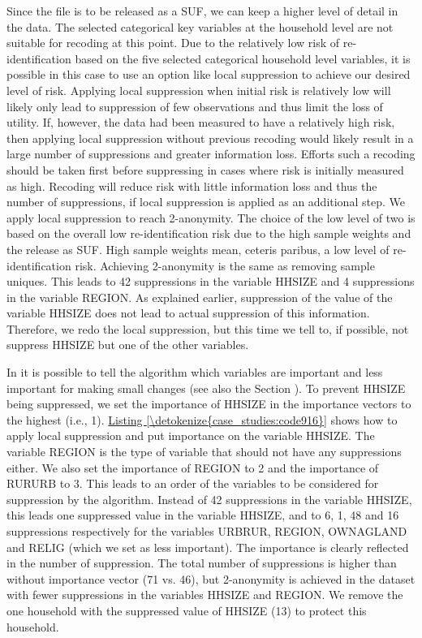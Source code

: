 \documentclass[letterpaper,10pt,english]{sphinxmanual}
\begin{document}
Since the file is to be released as a SUF, we can keep a higher level of
detail in the data. The selected categorical key variables at the
household level are not suitable for recoding at this point. Due to the
relatively low risk of re-identification based on the five selected
categorical household level variables, it is possible in this case to
use an option like local suppression to achieve our desired level of
risk. Applying local suppression when initial risk is relatively low
will likely only lead to suppression of few observations and thus limit
the loss of utility. If, however, the data had been measured to have a
relatively high risk, then applying local suppression without previous
recoding would likely result in a large number of suppressions and
greater information loss. Efforts such a recoding should be taken first
before suppressing in cases where risk is initially measured as high.
Recoding will reduce risk with little information loss and thus the
number of suppressions, if local suppression is applied as an additional
step. We apply local suppression to reach 2-anonymity. The choice of the
low level of two is based on the overall low re-identification risk due
to the high sample weights and the release as SUF. High sample weights
mean, ceteris paribus, a low level of re-identification risk. Achieving
2-anonymity is the same as removing sample uniques. This leads to 42
suppressions in the variable HHSIZE and 4 suppressions in the variable
REGION. As explained earlier, suppression of the value of the variable
HHSIZE does not lead to actual suppression of this information.
Therefore, we redo the local suppression, but this time we tell
 to, if possible, not suppress HHSIZE but one of the other
variables.

In  it is possible to tell the algorithm which variables are
important and less important for making small changes (see also the Section
).
To prevent HHSIZE being suppressed, we set the importance of
HHSIZE in the importance vectors to the highest (i.e., 1). \hyperref[\detokenize{case_studies:code916}]{Listing \ref{\detokenize{case_studies:code916}}}
shows how to apply local suppression and put importance on the variable
HHSIZE. The variable REGION is the type of variable that should not have
any suppressions either. We also set the importance of REGION to 2 and
the importance of RURURB to 3. This leads to an order of the variables
to be considered for suppression by the algorithm. Instead of 42
suppressions in the variable HHSIZE, this leads one suppressed value in
the variable HHSIZE, and to 6, 1, 48 and 16 suppressions respectively
for the variables URBRUR, REGION, OWNAGLAND and RELIG (which we set as
less important). The importance is clearly reflected in the number of
suppression. The total number of suppressions is higher than without
importance vector (71 vs. 46), but 2-anonymity is achieved in the
dataset with fewer suppressions in the variables HHSIZE and REGION. We
remove the one household with the suppressed value of HHSIZE (13) to
protect this household.
\end{document}

